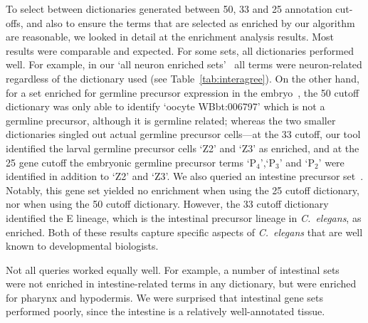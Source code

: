 \documentclass{bmcart}
\begin{document}
To select between dictionaries generated between 50, 33 and 25 annotation cut-offs, and also to ensure the terms that are selected as enriched by our algorithm are reasonable, we looked in detail at the enrichment analysis results.
Most results were comparable and expected. For some sets, all dictionaries performed well. For example, in our `all neuron enriched sets'~\cite{Spencer2011, Watson2008a} all terms were neuron-related %
regardless of the dictionary used (see Table~\ref{tab:interagree}). On the other hand, for a set enriched for germline precursor expression in the embryo~\cite{Spencer2011}, the 50 cutoff dictionary was only able to identify `oocyte WBbt:006797' which is not a germline precursor, although it is germline related; whereas the two smaller dictionaries singled out actual germline precursor cells---at the 33 cutoff, our tool identified the larval germline precursor cells `Z2' and `Z3' as enriched, and at the 25 gene cutoff the embryonic germline precursor terms `P$_4$',`P$_3$' and `P$_2$' were identified in addition to `Z2' and `Z3'. 
We also queried an intestine precursor set~\cite{Spencer2011}. Notably, this gene set yielded no enrichment when using the 25 cutoff dictionary, nor when using the 50 cutoff dictionary. However, the 33 cutoff dictionary identified the E lineage, which is the intestinal precursor lineage in \emph{C.~elegans}, as enriched. Both of these results capture specific aspects of \emph{C.~elegans} that are well known to developmental biologists. 

Not all queries worked equally well. For example, a number of intestinal  sets~\cite{Spencer2011, Pauli2006} were not enriched in intestine-related terms in any dictionary, but were enriched for pharynx and hypodermis. We were  surprised that intestinal gene sets performed poorly, since the intestine is a relatively well-annotated tissue. 
\end{document}

